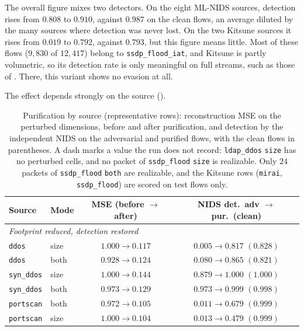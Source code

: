 The overall figure mixes two detectors. On the eight ML-NIDS sources, detection rises
from $0.808$ to $0.910$, against $0.987$ on the clean flows, an average diluted by the
many sources where detection was never lost. On the two Kitsune sources it
rises from $0.019$ to $0.792$, against $0.793$, but this figure means little. Most of
these flows ($9{,}830$ of $12{,}417$) belong to \texttt{ssdp\_flood\_iat}, and Kitsune is
partly volumetric, so its detection rate is only meaningful on full streams, such as
those of . There, this variant shows no evasion at all.

The effect depends strongly on the source ().

\begin{table}[tp]
\centering
\caption[Purification by source]{Purification by source (representative rows):
reconstruction MSE on the perturbed dimensions, before and after purification, and
detection by the independent NIDS on the adversarial and purified flows, with the clean
flows in parentheses. A dash marks a value the run does not record: \texttt{ldap\_ddos}
\texttt{size} has no perturbed cells, and no packet of \texttt{ssdp\_flood}
\texttt{size} is realizable. Only $24$ packets of \texttt{ssdp\_flood} \texttt{both} are
realizable, and the Kitsune rows (\texttt{mirai}, \texttt{ssdp\_flood}) are scored on
test flows only.}
\label{tab:eval-purifsrc}
\footnotesize
\setlength{\tabcolsep}{5pt}
\begin{tabular}{llcc}
\toprule
\textbf{Source} & \textbf{Mode} & \textbf{MSE (before $\rightarrow$ after)} & \textbf{NIDS det.\ adv $\rightarrow$ pur.\ (clean)} \\
\midrule
\multicolumn{4}{l}{\emph{Footprint reduced, detection restored}}\\
\texttt{ddos}        & size & $1.000 \rightarrow 0.117$ & $0.005 \rightarrow 0.817$ $(0.828)$ \\
\texttt{ddos}        & both & $0.928 \rightarrow 0.124$ & $0.080 \rightarrow 0.865$ $(0.821)$ \\
\texttt{syn\_ddos}   & size & $1.000 \rightarrow 0.144$ & $0.879 \rightarrow 1.000$ $(1.000)$ \\
\texttt{syn\_ddos}   & both & $0.973 \rightarrow 0.129$ & $0.973 \rightarrow 0.999$ $(0.998)$ \\
\texttt{portscan}    & both & $0.972 \rightarrow 0.105$ & $0.011 \rightarrow 0.679$ $(0.999)$ \\
\texttt{portscan}    & size & $1.000 \rightarrow 0.104$ & $0.013 \rightarrow 0.479$ $(0.999)$ \\

\end{tabular}
\end{table}

